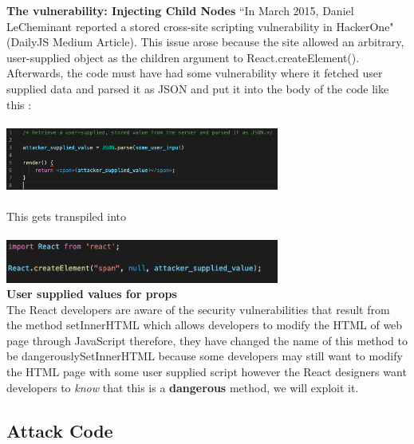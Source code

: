 \documentclass[conference]{IEEEtran}
\begin{document}
\textbf{The vulnerability: Injecting Child Nodes} ``In March 2015, Daniel LeCheminant reported a stored cross-site scripting vulnerability in HackerOne" (DailyJS Medium Article). This issue arose because the site allowed an arbitrary, user-supplied object as the children argument to React.createElement().\\
Afterwards, the code must have had some vulnerability where it fetched user supplied data and parsed it as JSON and put it into the body of the code like this :\\\\
\includegraphics[width = 9cm]{JAVASCRIPT.png}\\\\
This gets transpiled into \\\\
\includegraphics[width = 9cm]{TRANSPILEDATTACK.png}\\

\textbf{User supplied values for props}\\
The React developers are aware of the security vulnerabilities that result from the method setInnerHTML which allows developers to modify the HTML of web page through JavaScript therefore, they have changed the name of this method to be dangerouslySetInnerHTML because some developers may still want to modify the HTML page with some user supplied script however the React designers want developers to \textit{know} that this is a \textbf{dangerous} method, we will exploit it.
\subsection {Attack Code}
\end{document}

